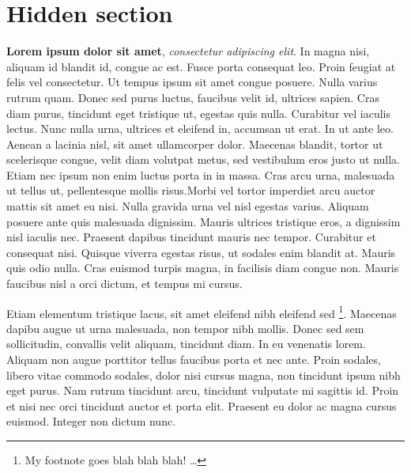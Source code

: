 \tochide\section{Hidden section}
\textbf{Lorem ipsum dolor sit amet}, \textit{consectetur adipiscing elit}. In magna nisi, aliquam id blandit id, congue ac est. Fusce porta consequat leo. Proin feugiat at felis vel consectetur. Ut tempus ipsum sit amet congue posuere. Nulla varius rutrum quam. Donec sed purus luctus, faucibus velit id, ultrices sapien. Cras diam purus, tincidunt eget tristique ut, egestas quis nulla. Curabitur vel iaculis lectus. Nunc nulla urna, ultrices et eleifend in, accumsan ut erat. In ut ante leo. Aenean a lacinia nisl, sit amet ullamcorper dolor. Maecenas blandit, tortor ut scelerisque congue, velit diam volutpat metus, sed vestibulum eros justo ut nulla. Etiam nec ipsum non enim luctus porta in in massa. Cras arcu urna, malesuada ut tellus ut, pellentesque mollis risus.Morbi vel tortor imperdiet arcu auctor mattis sit amet eu nisi. Nulla gravida urna vel nisl egestas varius. Aliquam posuere ante quis malesuada dignissim. Mauris ultrices tristique eros, a dignissim nisl iaculis nec. Praesent dapibus tincidunt mauris nec tempor. Curabitur et consequat nisi. Quisque viverra egestas risus, ut sodales enim blandit at. Mauris quis odio nulla. Cras euismod turpis magna, in facilisis diam congue non. Mauris faucibus nisl a orci dictum, et tempus mi cursus.

Etiam elementum tristique lacus, sit amet eleifend nibh eleifend sed \footnote{My footnote goes blah blah blah! \dots}. Maecenas dapibu augue ut urna malesuada, non tempor nibh mollis. Donec sed sem sollicitudin, convallis velit aliquam, tincidunt diam. In eu venenatis lorem. Aliquam non augue porttitor tellus faucibus porta et nec ante. Proin sodales, libero vitae commodo sodales, dolor nisi cursus magna, non tincidunt ipsum nibh eget purus. Nam rutrum tincidunt arcu, tincidunt vulputate mi sagittis id. Proin et nisi nec orci tincidunt auctor et porta elit. Praesent eu dolor ac magna cursus euismod. Integer non dictum nunc.


